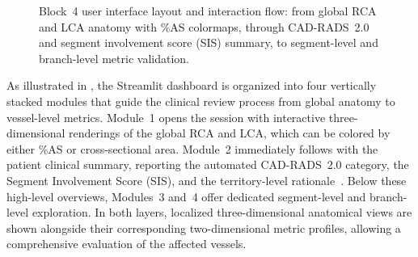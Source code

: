 \begin{figure}[H]
  \centering
  \caption{Block~4 user interface layout and interaction flow: from global RCA and LCA anatomy with \%AS colormaps, through CAD-RADS~2.0 and segment involvement score (SIS) summary, to segment-level and branch-level metric validation.}
  \label{fig:block4-interaction-flow}
\end{figure}

As illustrated in , the Streamlit dashboard is organized into four vertically stacked modules that guide the clinical review process from global anatomy to vessel-level metrics. Module~1 opens the session with interactive three-dimensional renderings of the global RCA and LCA, which can be colored by either \%AS or cross-sectional area. Module~2 immediately follows with the patient clinical summary, reporting the automated CAD-RADS~2.0 category, the Segment Involvement Score (SIS), and the territory-level rationale~\cite{cury2022}. Below these high-level overviews, Modules~3 and~4 offer dedicated segment-level and branch-level exploration. In both layers, localized three-dimensional anatomical views are shown alongside their corresponding two-dimensional metric profiles, allowing a comprehensive evaluation of the affected vessels.

